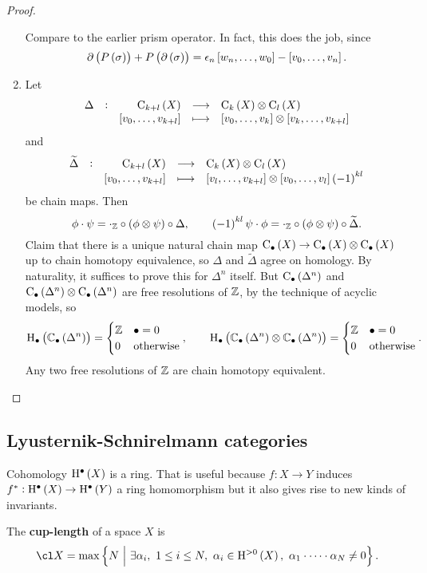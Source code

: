 \begin{proof}
\begin{enumerate}[leftmargin=0.5in, label=Sketch \arabic*.]
Compare to the earlier prism operator. In fact, this does the job, since
$$ \da\br{P\br{\sigma}} + P\br{\da\br{\sigma}} = \epsilon_n\sbr{w_n, \dots, w_0} - \sbr{v_0, \dots, v_n}. $$
\item Let
$$ \function[\Delta]{\C_{k + l}\br{X}}{\C_k\br{X} \otimes \C_l\br{X}}{\sbr{v_0, \dots, v_{k + l}}}{\sbr{v_0, \dots, v_k} \otimes \sbr{v_k, \dots, v_{k + l}}} $$
and
$$ \function[\widetilde{\Delta}]{\C_{k + l}\br{X}}{\C_k\br{X} \otimes \C_l\br{X}}{\sbr{v_0, \dots, v_{k + l}}}{\sbr{v_l, \dots, v_{k + l}} \otimes \sbr{v_0, \dots, v_l}\br{-1}^{kl}} $$
be chain maps. Then
$$ \phi \cdot \psi = \cdot_\ZZ \circ \br{\phi \otimes \psi} \circ \Delta, \qquad \br{-1}^{kl}\psi \cdot \phi = \cdot_\ZZ \circ \br{\phi \otimes \psi} \circ \widetilde{\Delta}. $$
Claim that there is a unique natural chain map $ \C_\bullet\br{X} \to \C_\bullet\br{X} \otimes \C_\bullet\br{X} $ up to chain homotopy equivalence, so $ \Delta $ and $ \widetilde{\Delta} $ agree on homology. By naturality, it suffices to prove this for $ \Delta^n $ itself. But $ \C_\bullet\br{\Delta^n} $ and $ \C_\bullet\br{\Delta^n} \otimes \C_\bullet\br{\Delta^n} $ are free resolutions of $ \mathbb{Z} $, by the technique of acyclic models, so
$$ \H_\bullet\br{\CC_\bullet\br{\Delta^n}} =
\begin{cases}
\ZZ & \bullet = 0 \\
0 & \text{otherwise}
\end{cases},
\qquad \H_\bullet\br{\CC_\bullet\br{\Delta^n} \otimes \CC_\bullet\br{\Delta^n}} =
\begin{cases}
\ZZ & \bullet = 0 \\
0 & \text{otherwise}
\end{cases}.
$$
Any two free resolutions of $ \mathbb{Z} $ are chain homotopy equivalent.
\end{enumerate}
\end{proof}

\pagebreak

\subsection{Lyusternik-Schnirelmann categories}


Cohomology $ \H^\bullet\br{X} $ is a ring. That is useful because $ f : X \to Y $ induces $ f^* : \H^\bullet\br{X} \to \H^\bullet\br{Y} $ a ring homomorphism but it also gives rise to new kinds of invariants.

\begin{definition*}
The \textbf{cup-length} of a space $ X $ is
$$ \cl X = \max \cbr{N \st \exists \alpha_i, \ 1 \le i \le N, \ \alpha_i \in \H^{> 0}\br{X}, \ \alpha_1 \cdot \dots \cdot \alpha_N \ne 0}. $$
\end{definition*}

